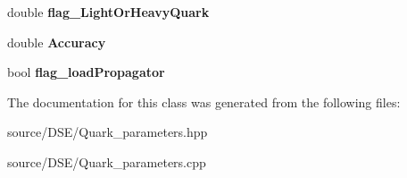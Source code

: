 \begin{DoxyCompactItemize}
\item 
\hypertarget{class_c___quark__parameters_ab8e384ddf5a6d722a768e7179c4e0c2e}{double {\bfseries flag\-\_\-\-Light\-Or\-Heavy\-Quark}}\label{class_c___quark__parameters_ab8e384ddf5a6d722a768e7179c4e0c2e}

\item 
\hypertarget{class_c___quark__parameters_ac1e6225033703e6a438930d107df16a3}{double {\bfseries Accuracy}}\label{class_c___quark__parameters_ac1e6225033703e6a438930d107df16a3}

\item 
\hypertarget{class_c___quark__parameters_adb9de54db5fdb4d9d326e0d7cfba38a5}{bool {\bfseries flag\-\_\-load\-Propagator}}\label{class_c___quark__parameters_adb9de54db5fdb4d9d326e0d7cfba38a5}

\end{DoxyCompactItemize}


The documentation for this class was generated from the following files\-:\begin{DoxyCompactItemize}
\item 
source/\-D\-S\-E/Quark\-\_\-parameters.\-hpp\item 
source/\-D\-S\-E/Quark\-\_\-parameters.\-cpp\end{DoxyCompactItemize}
